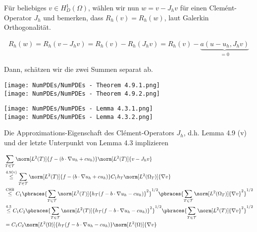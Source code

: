 \begin{solution}
\begin{enumerate}[label = \textbf{\alph*)}]
  Für beliebiges $v \in H_D^1(\Omega)$, wählen wir nun $w = v - J_h v$ für
  einen Clemént-Operator $J_h$ und bemerken, dass $R_h(v) = R_h(w)$, laut Galerkin Orthogonalität.

  \begin{align*}
    R_h(w)
    =
    R_h(v - J_h v)
    =
    R_h(v) - R_h(J_h v)
    =
    R_h(v) - \underbrace{a(u - u_h, J_h v)}_{=0}
  \end{align*}

  Dann, schätzen wir die zwei Summen separat ab.

  \begin{tcolorbox}[standard jigsaw, opacityback = 0]
    \centering
    \texttt{[image: NumPDEs/NumPDEs - Theorem 4.9.1.png]} \\
    \texttt{[image: NumPDEs/NumPDEs - Theorem 4.9.2.png]}
  \end{tcolorbox}

  \begin{tcolorbox}[standard jigsaw, opacityback = 0]
    \centering
    \texttt{[image: NumPDEs/NumPDEs - Lemma 4.3.1.png]} \\
    \texttt{[image: NumPDEs/NumPDEs - Lemma 4.3.2.png]}
  \end{tcolorbox}

  Die Approximations-Eigenschaft des Clément-Operators $J_h$, d.h. Lemma 4.9 (v) und der letzte Unterpunkt von Lemma 4.3 implizieren

  \begin{align*}
    & \sum_{T \in \mathcal{T}}
    \norm[L^2(T)]{f - (b \cdot \nabla u_h + c u_h)}
    \norm[L^2(T)]{v - J_h v} \\
    & \stackrel
    {
      \mathrm{4.9 (v)}
    }{\leq}
    \sum_{T \in \mathcal{T}}
    \norm[L^2(T)]{f - (b \cdot \nabla u_h + c u_h)}
    C_1 h_T
    \norm[L^2(\Omega_T)]{\nabla v} \\
    & \stackrel
    {
      \mathrm{CSB}
    }{\leq}
    C_1
    \pbraces
    {
      \sum_{T \in \mathcal{T}}
      \norm[L^2(T)]{h_\mathcal{T} (f - b \cdot \nabla u_h - c u_h)}^2
    }^{1/2}
    \pbraces
    {
      \sum_{T \in \mathcal{T}}
      \norm[L^2(\Omega_T)]{\nabla v}^2
    }^{1/2} \\
    & \stackrel
    {
      \mathrm{4.3}
    }{\leq}
    C_1 C_2
    \pbraces
    {
      \sum_{T \in \mathcal{T}}
      \norm[L^2(T)]{h_\mathcal{T} (f - b \cdot \nabla u_h - c u_h)}^2
    }^{1/2}
    \pbraces
    {
      \sum_{T \in \mathcal{T}}
      \norm[L^2(T)]{\nabla v}^2
    }^{1/2} \\
    & =
    C_1 C_2
    \norm[L^2(\Omega)]{h_\mathcal{T} (f - b \cdot \nabla u_h - c u_h)}
    \norm[L^2(\Omega)]{\nabla v}
  \end{align*}


\end{enumerate}
\end{solution}
